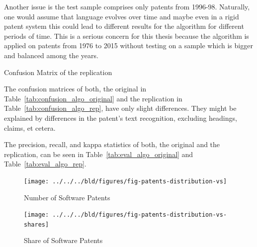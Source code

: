 \documentclass[12pt, a4paper, abstract, parskip]{scrartcl}
\newcommand{\ra}[1]{\renewcommand{\arraystretch}{#1}}
\theoremstyle{definition}
\begin{document}
Another issue is the test sample comprises only patents from 1996-98.
Naturally, one would assume that language evolves over time and maybe even in a
rigid patent system this could lead to different results for the algorithm for
different periods of time. This is a serious concern for this thesis because
the algorithm is applied on patents from 1976 to 2015 without testing on a
sample which is bigger and balanced among the years.

\begin{table}[tb]\caption{Confusion Matrix of the replication}\label{tab:confusion_algo_rep}\centering\ra{1.3}
    
\end{table}

The confusion matrices of both, the original in
Table~\ref{tab:confusion_algo_original} and the replication in
Table~\ref{tab:confusion_algo_rep}, have only slight differences. They might be
explained by differences in the patent's text recognition, excluding headings,
claims, et cetera.

The precision, recall, and kappa statistics of both, the original and the
replication, can be seen in Table~\ref{tab:eval_algo_original} and
Table~\ref{tab:eval_algo_rep}.

\begin{figure}[tb]
	\centering
	\texttt{[image: ../../../bld/figures/fig-patents-distribution-vs]}
	\caption{Number of Software Patents}
	\label{fig:softpat}
\end{figure}

\begin{figure}[tb]
	\centering
	\texttt{[image: ../../../bld/figures/fig-patents-distribution-vs-shares]}
	\caption{Share of Software Patents}
	\label{fig:sharesoft}
\end{figure}
\end{document}
